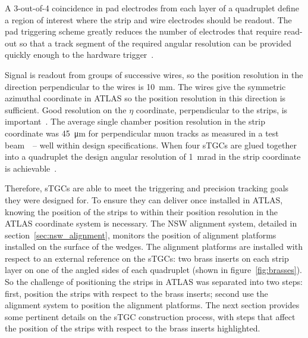 A 3-out-of-4 coincidence in pad electrodes from each layer of a quadruplet define a region of interest where the strip and wire electrodes should be readout. The pad triggering scheme greatly reduces the number of electrodes that require read-out so that a track segment of the required angular resolution can be provided quickly enough to the hardware trigger~\cite{nsw_tdr}.

Signal is readout from groups of successive wires, so the position resolution in the direction perpendicular to the wires is \SI{10}{mm}. The wires give the symmetric azimuthal coordinate in ATLAS so the position resolution in this direction is sufficient. Good resolution on the $\eta$ coordinate, perpendicular to the strips, is important~\cite{nsw_tdr}. The average single chamber position resolution in the strip coordinate was \SI{45}{\micro\meter} for perpendicular muon tracks as measured in a test beam~\cite{abusleme_performance_2016}~-- well within design specifications. When four sTGCs are glued together into a quadruplet the design angular resolution of \SI{1}{mrad} in the strip coordinate is achievable~\cite{nsw_tdr, perez-codina_small-strip_2016}. 

Therefore, sTGCs are able to meet the triggering and precision tracking goals they were designed for. To ensure they can deliver once installed in ATLAS, knowing the position of the strips to within their position resolution in the ATLAS coordinate system is necessary. The NSW alignment system, detailed in section~\ref{sec:nsw_alignment}, monitors the position of alignment platforms installed on the surface of the wedges. The alignment platforms are installed with respect to an external reference on the sTGCs: two brass inserts on each strip layer on one of the angled sides of each quadruplet (shown in figure~\ref{fig:brasses}). So the challenge of positioning the strips in ATLAS was separated into two steps: first, position the strips with respect to the brass inserts; second use the alignment system to position the alignment platforms. The next section provides some pertinent details on the sTGC construction process, with steps that affect the position of the strips with respect to the brass inserts highlighted.

